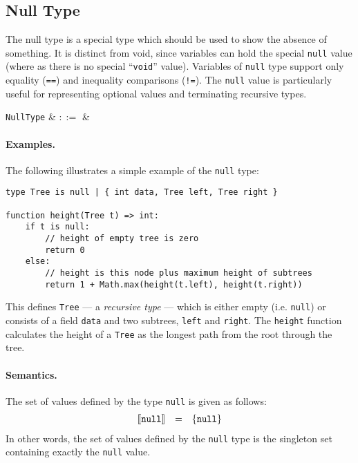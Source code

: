 
\subsection{Null Type}

The null type is a special type which should be used to show the absence of something. It is distinct from void, since variables can hold the special \lstinline{null} value (where as there is no special ``\lstinline{void}'' value).  Variables of \lstinline{null} type support only equality (\lstinline{==}) and inequality comparisons (\lstinline{!=}).  The \lstinline{null} value is particularly useful for representing optional values and terminating recursive types.

\begin{syntax}
  \verb+NullType+ & $::=$ &  \\
\end{syntax}

\paragraph{Examples.}  The following illustrates a simple example of the \lstinline{null} type:

\begin{lstlisting}
type Tree is null | { int data, Tree left, Tree right }

function height(Tree t) => int:
    if t is null:
        // height of empty tree is zero
        return 0
    else:
        // height is this node plus maximum height of subtrees
        return 1 + Math.max(height(t.left), height(t.right))
\end{lstlisting}
This defines \lstinline{Tree} --- a {\em recursive type} --- which is either empty (i.e. \lstinline{null}) or consists of a field \lstinline{data} and two subtrees, \lstinline{left} and \lstinline{right}.  The \lstinline{height} function calculates the height of a \lstinline{Tree} as the longest path from the root through the tree.

\paragraph{Semantics.}  The set of values defined by the type \lstinline{null} is given as follows:
\begin{displaymath}
\begin{array}{rcl}
\llbracket{\tt null}\rrbracket & = & \{{\tt null}\}\\
\end{array}
\end{displaymath}
In other words, the set of values defined by the \lstinline{null} type is the singleton set containing exactly the \lstinline{null} value.


